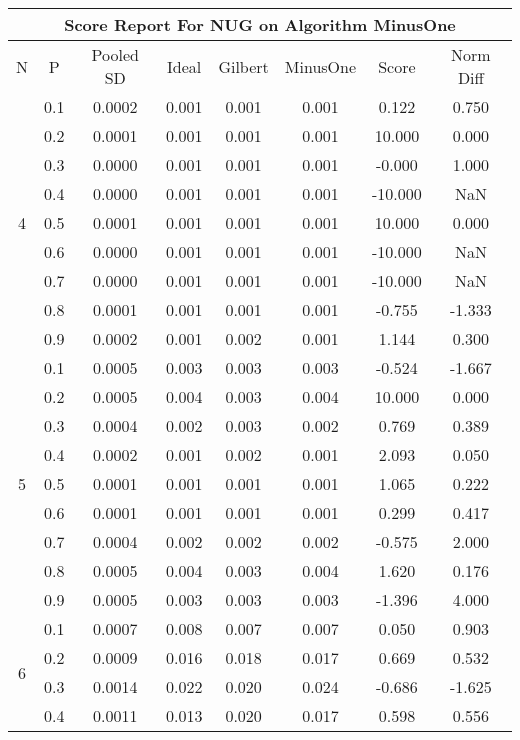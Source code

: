 \documentclass[11pt,a4paper]{report}
\begin{document}
\begin{longtable}{ | c | c || c | c | c | c | c | c | }
\hline
\multicolumn{8}{|c|}{ Score Report For NUG on Algorithm MinusOne} \\
\hline
N & P & Pooled SD &  Ideal &  Gilbert & MinusOne  & Score & Norm Diff \\
 \hline
 \hline
 \endhead
\multirow{9}{*}{4} & 0.1 & 0.0002 & 0.001 & 0.001 & 0.001 & 0.122 & 0.750 \\
 & 0.2 & 0.0001 & 0.001 & 0.001 & 0.001 & 10.000 & 0.000 \\
 & 0.3 & 0.0000 & 0.001 & 0.001 & 0.001 & -0.000 & 1.000 \\
 & 0.4 & 0.0000 & 0.001 & 0.001 & 0.001 & -10.000 & NaN \\
 & 0.5 & 0.0001 & 0.001 & 0.001 & 0.001 & 10.000 & 0.000 \\
 & 0.6 & 0.0000 & 0.001 & 0.001 & 0.001 & -10.000 & NaN \\
 & 0.7 & 0.0000 & 0.001 & 0.001 & 0.001 & -10.000 & NaN \\
 & 0.8 & 0.0001 & 0.001 & 0.001 & 0.001 & -0.755 & -1.333 \\
 & 0.9 & 0.0002 & 0.001 & 0.002 & 0.001 & 1.144 & 0.300 \\
 \hline
\multirow{9}{*}{5} & 0.1 & 0.0005 & 0.003 & 0.003 & 0.003 & -0.524 & -1.667 \\
 & 0.2 & 0.0005 & 0.004 & 0.003 & 0.004 & 10.000 & 0.000 \\
 & 0.3 & 0.0004 & 0.002 & 0.003 & 0.002 & 0.769 & 0.389 \\
 & 0.4 & 0.0002 & 0.001 & 0.002 & 0.001 & 2.093 & 0.050 \\
 & 0.5 & 0.0001 & 0.001 & 0.001 & 0.001 & 1.065 & 0.222 \\
 & 0.6 & 0.0001 & 0.001 & 0.001 & 0.001 & 0.299 & 0.417 \\
 & 0.7 & 0.0004 & 0.002 & 0.002 & 0.002 & -0.575 & 2.000 \\
 & 0.8 & 0.0005 & 0.004 & 0.003 & 0.004 & 1.620 & 0.176 \\
 & 0.9 & 0.0005 & 0.003 & 0.003 & 0.003 & -1.396 & 4.000 \\
 \hline
\multirow{9}{*}{6} & 0.1 & 0.0007 & 0.008 & 0.007 & 0.007 & 0.050 & 0.903 \\
 & 0.2 & 0.0009 & 0.016 & 0.018 & 0.017 & 0.669 & 0.532 \\
 & 0.3 & 0.0014 & 0.022 & 0.020 & 0.024 & -0.686 & -1.625 \\
 & 0.4 & 0.0011 & 0.013 & 0.020 & 0.017 & 0.598 & 0.556 \\

\end{longtable}
\end{document}
